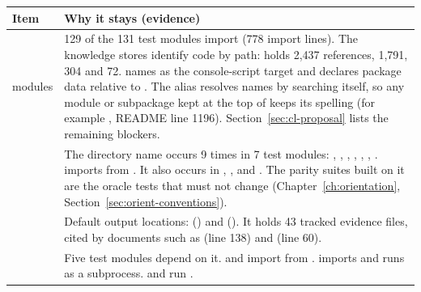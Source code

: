 {\small
\begin{longtable}{P{3.3cm}P{12.1cm}}
\toprule
Item & Why it stays (evidence) \\
\midrule
\endhead
{} modules & 129 of the 131 test modules import  (778 import lines). The knowledge stores identify code by path:  holds 2,437  references,  1,791,  304 and  72.  names  as the console-script target and declares package data relative to . The  alias resolves names by searching  itself, so any module or subpackage kept at the top of  keeps its  spelling (for example , README line 1196). Section~\ref{sec:cl-proposal} lists the remaining blockers. \\
 & The directory name occurs 9 times in 7 test modules: , , , , , , .  imports  from . It also occurs in , ,  and . The parity suites built on it are the oracle tests that must not change (Chapter~\ref{ch:orientation}, Section~\ref{sec:orient-conventions}). \\
 & Default output locations:  () and  (). It holds 43 tracked evidence files, cited by documents such as  (line 138) and  (line 60). \\
 & Five test modules depend on it.  and  import from .  imports  and runs  as a subprocess.  and  run . \\

\end{longtable}}
